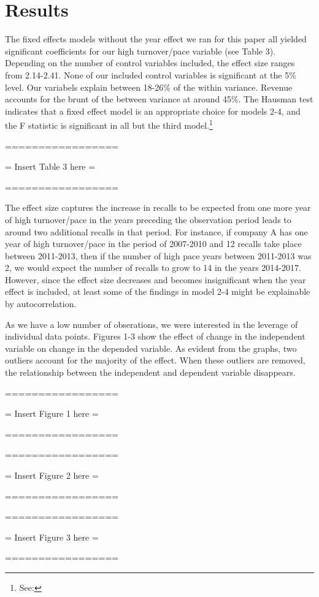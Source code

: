 \section{Results}

The fixed effects models without the year effect we ran for this paper all yielded significant coefficients for our high turnover/pace variable (see Table 3). Depending on the number of control variables included, the effect size ranges from 2.14-2.41. None of our included control variables is significant at the 5\% level. Our variabels explain between 18-26\% of the within variance. Revenue accounts for the brunt of the between variance at around 45\%. The Hausman test indicates that a fixed effect model is an appropriate choice for models 2-4, and the F statistic is significant in all but the third model.\footnote{See: \log}

\begin{center}
	
	=================
	
	= Insert Table 3 here =
	
	=================
	
	
	
	
\end{center}

The effect size captures the increase in recalls to be expected from one more year of high turnover/pace in the years preceding the observation period leads to around two additional recalls in that period. For instance, if company A has one year of high turnover/pace in the period of 2007-2010 and 12 recalls take place between 2011-2013, then if the number of high pace years between 2011-2013 was 2, we would expect the number of recalls to grow to 14 in the years 2014-2017. However, since the effect size decreases and becomes insignificant when the year effect is included,  at least some of the findings in model 2-4 might be explainable by autocorrelation.

As we have a low number of obserations, we were interested in the leverage of individual data points. Figures 1-3 show the effect of change in the independent variable on change in the depended variable. As evident from the graphs, two outliers account for the majority of the effect. When these outliers are removed, the relationship between the independent and dependent variable disappears.

\begin{center}
	=================
	
	= Insert Figure 1 here =
	
	=================
	
	=================
	
	= Insert Figure 2 here =
	
	=================
	
	=================
	
	= Insert Figure 3 here =

	=================
\end{center}

